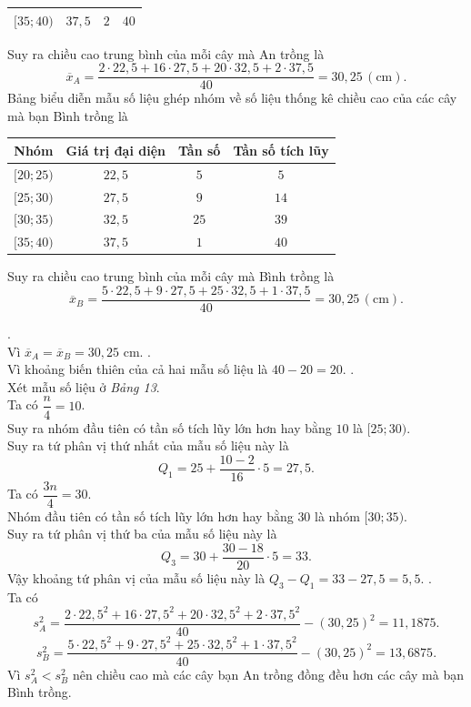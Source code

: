 \begin{ex}
{\begin{center}
\begin{tabular}{|c|c|c|c|}
				$[35; 40)$ & $37{,} 5$& $2$ & $40$\\ 
				\hline 
			\end{tabular}
		\end{center}
		Suy ra chiều cao trung bình của mỗi cây mà  An trồng là \[\overline{x}_A= \dfrac{2 \cdot 22{,}5 + 16 \cdot 27{,}5 + 20 \cdot 32{,}5 + 2 \cdot 37{,} 5}{40}= 30{,} 25 \, (\text{cm}).\]
		Bảng biểu diễn mẫu số liệu ghép nhóm về số liệu thống kê chiều  cao của các cây mà bạn Bình trồng là
		\begin{center}
			\begin{tabular}{|c|c|c|c|}
				 \hline
				Nhóm &  Giá trị đại diện & Tần số & Tần số tích lũy\\
				 \hline
				$[20; 25)$ & $22{,} 5$& $5$ &  $5$ \\
				$[25;  30)$ & $27{,} 5$ & $9$ & $14$\\
				$[30; 35)$ & $32{,} 5$  & $25$ & $39$\\
				$[35; 40)$ & $37{,}  5$& $1$ & $40$\\
				\hline 
			\end{tabular}
		\end{center}
		Suy ra chiều cao  trung bình của mỗi cây mà Bình trồng là \[\overline{x}_B= \dfrac{5 \cdot 22{,}5 + 9 \cdot 27{,}5 + 25 \cdot 32{,}5 + 1\cdot 37{,} 5}{40}= 30{,} 25 \, (\text{cm}).\]
		\begin{itemchoice}
			. \\
			Vì $\overline{x}_A=  \overline{x}_B= 30{,} 25$ cm.
			.  \\
			Vì khoảng biến thiên của cả hai mẫu số liệu là  $40-20=20$.
			.\\ 
			Xét mẫu số liệu ở \textit{Bảng  13}.\\
			Ta có $\dfrac{n}{4}  = 10$.\\
			Suy ra nhóm đầu tiên có tần số  tích lũy lớn hơn hay bằng $10$ là $ [25; 30)$.\\
			Suy ra tứ phân vị  thứ nhất của mẫu số liệu này là \[Q_1= 25 +\dfrac{10 - 2}{16} \cdot 5=27{,}5.\]
			Ta có $\dfrac{3n}{4}= 30$.\\ 
			Nhóm đầu tiên có tần số tích lũy lớn hơn  hay bằng $30$ là nhóm $[30; 35)$.\\
			Suy ra tứ phân vị thứ ba  của mẫu số liệu này là \[Q_3= 30 +\dfrac{30- 18}{20} \cdot 5=33.\]
			Vậy khoảng tứ phân vị của mẫu số liệu này là $Q_3-Q_1= 33- 27{,}5 =  5{,}5 $.
			. \\ 
			Ta có \[s^2_A = \dfrac{2 \cdot 22{,}5^2 + 16 \cdot 27{,}5^2 + 20 \cdot 32{,}5^2 + 2 \cdot 37{,} 5^2}{40}  - (30{,} 25)^2= 11{,} 1875.\]
			\[s^2_B=\dfrac{5 \cdot 22{,}5^2 + 9 \cdot 27{,}5^2 + 25 \cdot 32{,}5^2 + 1\cdot 37{,} 5^2}{40}-(30{,}25)^2=  13{,}6875.\]
			Vì $s_A^2 <s_B^2$ nên chiều cao mà các cây bạn An trồng đồng đều hơn các cây  mà bạn Bình trồng.
	\end{itemchoice}}
\end{ex}



